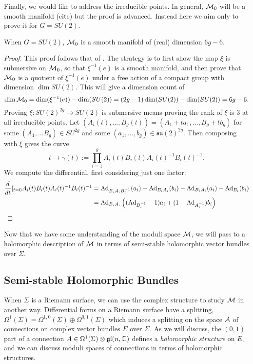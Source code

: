 	Finally, we would like to address the irreducible points. In general, $\mathcal{M}_0$ will be a smooth manifold (cite) but the proof is advanced. Instead here we aim only to prove it for $G=SU(2)$. 
	\begin{theorem}
		When $G=SU(2)$, $\mathcal{M}_0$ is a smooth manifold of (real) dimension $6g-6$.
	\end{theorem}
	\begin{proof}
		This proof follows that of \cite[Thm 96]{michiels_moduli_nodate}. The strategy is to first show the map $\xi$ is submersive on $\mathcal{M}_0$, so that $\xi^{-1}(e)$ is a smooth manifold, and then prove that $\mathcal{M}_0$ is a quotient of $\xi^{-1}(e)$ under a free action of a compact group with dimension $\dim SU(2)$. This will give a dimension count of
		\begin{equation}
			\dim \mathcal{M}_0 = \dim(\xi^{-1}(e)) - \dim(SU(2)) = (2g-1)\dim(SU(2)) - \dim(SU(2)) = 6g-6.
		\end{equation} 
		Proving $\xi:SU(2)^{2g} \to SU(2)$ is submersive means proving the rank of $\xi$ is 3 at all irreducible points. Let $(A_i(t),...,B_g(t)) = (A_1 + ta_1,..., B_g + tb_g)$ for some $(A_1,...B_g) \in SU^{2g}$ and some $(a_1,...,b_g) \in \mathfrak{su}(2)^{2g}$. Then composing with $\xi$ gives the curve
		\begin{equation}
			t\to \gamma(t):= \prod_{i=1}^g A_i(t)B_i(t)A_i(t)^{-1}B_i(t)^{-1}.
		\end{equation}
		We compute the differential, first considering just one factor:
		\begin{align*}
			\frac{d}{dt}|_{t=0} A_i(t)B_i(t)A_i(t)^{-1}B_i(t)^{-1} &= \text{Ad}_{B_iA_iB_i^{-1}}(a_i) + \text{Ad}_{B_iA_i}(b_i) - \text{Ad}_{B_iA_i}(a_i) - \text{Ad}_{B_i}(b_i)\\
			&= \text{Ad}_{B_iA_i}\left(
			(\text{Ad}_{B_i^{-1}}-1)a_i + (1-\text{Ad}_{A_i^{-1}})b_i
			\right)
		\end{align*}
		
	\end{proof}
	Now that we have some understanding of the moduli space $\mathcal{M}$, we will pass to a holomorphic description of $\mathcal{M}$ in terms of semi-stable holomorphic vector bundles over $\Sigma$.
	\subsection{Semi-stable Holomorphic Bundles}
	When $\Sigma$ is a Riemann surface, we can use the complex structure to study $\mathcal{M}$ in another way. Differential forms on a Riemann surface have a splitting, $\Omega^1(\Sigma) = \Omega^{1,0}(\Sigma)\oplus \Omega^{0,1}(\Sigma)$ which induces a splitting on the space $\mathcal{A}$ of connections on complex vector bundles $E$ over $\Sigma$. As we will discuss, the $(0,1)$ part of a connection $A\in \Omega^1(\Sigma)\otimes \mathfrak{gl}(n,\mathbb{C})$ defines a \emph{holomorphic structure} on $E$, and we can discuss moduli spaces of connections in terms of holomorphic structures.
	
